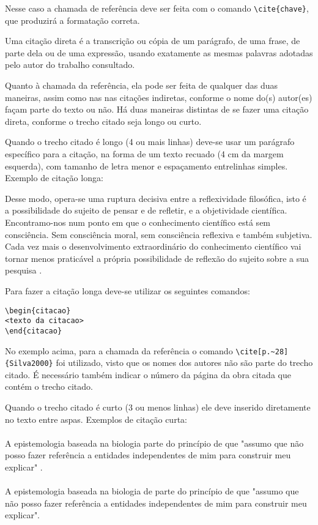 Nesse caso a chamada de referência deve ser feita com o comando \verb|\cite{chave}|, que produzirá a formatação correta.

Uma citação direta é a transcrição ou cópia de um parágrafo, de uma frase, de parte dela ou de uma expressão, usando exatamente as mesmas palavras adotadas pelo autor do trabalho consultado.

Quanto à chamada da referência, ela pode ser feita de qualquer das duas maneiras, assim como nas nas citações indiretas, conforme o nome do(s) autor(es) façam parte do texto ou não. Há duas maneiras distintas de se fazer uma citação direta, conforme o trecho citado seja longo ou curto.

Quando o trecho citado é longo (4 ou mais linhas) deve-se usar um parágrafo específico para a citação, na forma de um texto recuado (4 cm da margem esquerda), com tamanho de letra menor e espaçamento entrelinhas simples. Exemplo de citação longa:
\\\begin{citacao}
Desse modo, opera-se uma ruptura decisiva entre a reflexividade filosófica, isto é a possibilidade do sujeito de pensar e de refletir, e a objetividade científica. Encontramo-nos num ponto em que o conhecimento científico está sem consciência. Sem consciência moral, sem consciência reflexiva e também subjetiva. Cada vez mais o desenvolvimento extraordinário do conhecimento científico vai tornar menos praticável a própria possibilidade de reflexão do sujeito sobre a sua pesquisa \cite[p.~28]{Silva2000}.
\end{citacao}

Para fazer a citação longa deve-se utilizar os seguintes comandos:
\begin{verbatim}
\begin{citacao}
<texto da citacao>
\end{citacao}
\end{verbatim}

No exemplo acima, para a chamada da referência o comando \verb|\cite[p.~28]{Silva2000}| foi utilizado, visto que os nomes dos autores não são parte do trecho citado. É necessário também indicar o número da página da obra citada que contém o trecho citado.

Quando o trecho citado é curto (3 ou menos linhas) ele deve inserido diretamente no texto entre aspas. Exemplos de citação curta:\\
\\A epistemologia baseada na biologia parte do princípio de que "assumo que não posso fazer referência a entidades independentes de mim para construir meu explicar" \cite[p.~35]{Maturana2003}.\\
\\A epistemologia baseada na biologia de  parte do princípio de que "assumo que não posso fazer referência a entidades independentes de mim para construir meu explicar".\\

